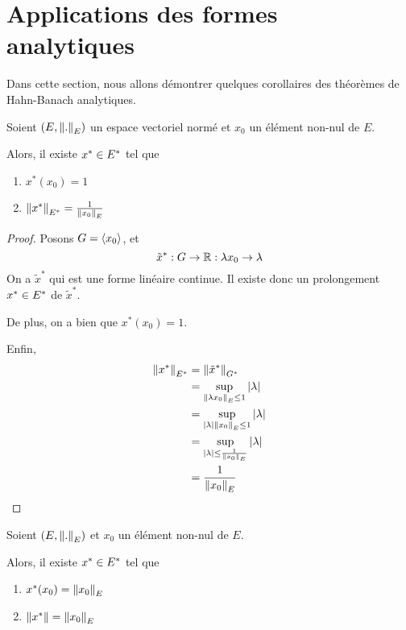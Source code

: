 \section{Applications des formes analytiques}

Dans cette section, nous allons démontrer quelques corollaires des théorèmes de
Hahn-Banach analytiques.

\begin{corollary}
	Soient $(E, \norm{.}_{E})$ un espace vectoriel normé et $x_{0}$
	un élément non-nul de $E$.

	Alors, il existe $x^{*} \in E^{*}$ tel que
	\begin{enumerate}
		\item $x^{*}(x_{0}) = 1$
		\item $\norm{x^{*}}_{E^{*}} = \frac{1}{\norm{x_{0}}_{E}}$
	\end{enumerate}
\end{corollary}

\ifdefined\outputproof
\begin{proof}
	Posons $G = \left<x_{0}\right>$, et
	\begin{equation}
		\tilde{x}^{*} : G \rightarrow \mathbb{R} : \lambda x_{0} \rightarrow \lambda
	\end{equation}
	On a $\tilde{x}^{*}$ qui est une forme linéaire continue. Il existe donc un
	prolongement $x^{*} \in E^{*}$ de $\tilde{x}^{*}$.

	De plus, on a bien que $x^{*}(x_{0}) = 1$.

	Enfin,
	\begin{align}
		\norm{x^{*}}_{E^{*}} &= \norm{\tilde{x}^{*}}_{G^{*}} \\
		&= \sup_{\norm{\lambda x_{0}}_{E} \leq 1} \abs{\lambda} \\
		&= \sup_{\abs{\lambda} \norm{x_{0}}_{E} \leq 1} \abs{\lambda} \\
		&= \sup_{|\lambda| \leq \frac{1}{\norm{x_{0}}_{E}}} \abs{\lambda} \\
		&= \frac{1}{\norm{x_{0}}_{E}}
	\end{align}
\end{proof}
\fi

\begin{corollary}
	Soient $(E, \norm{.}_{E})$ et $x_{0}$ un élément non-nul de $E$.

	Alors, il existe $x^{*} \in E^{*}$ tel que
	\begin{enumerate}
		\item $x^{*}(x_{0}) = \norm{x_{0}}_{E}$
		\item $\norm{x^{*}} = \norm{x_{0}}_{E}$
	\end{enumerate}
\end{corollary}

